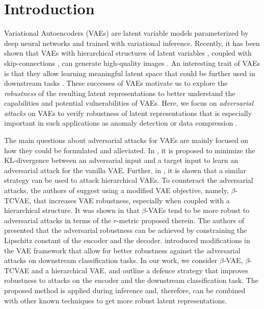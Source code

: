 \section{Introduction}\label{sec:intro}

Variational Autoencoders (VAEs) \cite{kingma2014autoencoding, rezende2014stochastic} are latent variable models parameterized by deep neural networks and trained with variational inference. Recently, it has been shown that VAEs with hierarchical structures of latent variables \cite{Ranganath2016-yg}, coupled with skip-connections \cite{Maaloe2019-bp, So_nderby2016-en}, can generate high-quality images \cite{Child2020-ze, Vahdat2020-xe}. An interesting trait of VAEs is that they allow learning meaningful latent space that could be further used in downstream tasks \cite{bengio2013representation, higgins2017darla}. These successes of VAEs motivate us to explore the \textit{robustness} of the resulting latent representations to better understand the capabilities and potential vulnerabilities of VAEs. Here, we focus on \textit{adversarial attacks} on VAEs to verify robustness of latent representations that is especially important in such applications as anomaly detection \cite{an2015variational, Maaloe2019-bp} or data compression \cite{balle2018variational, habibian2019video}. 

The main questions about adversarial attacks for VAEs are mainly focused on how they could be formulated and alleviated. In \cite{Gondim-Ribeiro2018-cu}, it is proposed to minimize the KL-divergence between an adversarial input and a target input to learn an adversarial attack for the vanilla VAE. Further, in \cite{kuzina2021adv}, it is shown that a similar strategy can be used to attack hierarchical VAEs. To counteract the adversarial attacks, the authors of \cite{Willetts2019-mu} suggest using a modified VAE objective, namely, $\beta$-TCVAE, that increases VAE robustness, especially when coupled with a hierarchical structure. It was shown in \cite{camuto2021towards} that $\beta$-VAEs tend to be more robust to adversarial attacks in terms of the $r$-metric proposed therein. The authors of \cite{barrett2021certifiably} presented that the adversarial robustness can be achieved by constraining the Lipschitz constant of the encoder and the decoder. \cite{cemgil2020autoencoding, Cemgil2019-vn} introduced modifications in the VAE framework that allow for better robustness against the adversarial attacks on downstream classification tasks. In our work, we consider $\beta$-VAE, $\beta$-TCVAE and a hierarchical VAE, and outline a defence strategy that improves robustness to attacks on the encoder and the downstream classification task. The proposed method is applied during inference and, therefore, can be combined with other known techniques to get more robust latent representations.


